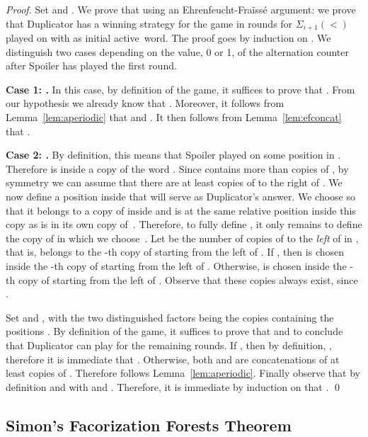 \documentclass[envcountsame]{llncs}
\newcommand{\efgame}{Ehrenfeucht-Fra\"iss\'e\xspace}
\newcommand{\siw}[1]{\ensuremath{\Sigma_{#1}(<)}\xspace}
\begin{document}
\begin{proof}
  Set  and . We prove
  that  using an \efgame argument: we prove that Duplicator
  has a winning strategy for the game in  rounds for \siw{i+1} played on  with 
  as initial active~word. The proof goes by induction on . We
  distinguish two cases depending on the value, 0 or 1, of the alternation counter 
  after Spoiler has played the first round.

  \medskip
  \noindent
  {\bf Case 1: .} In this case, by definition of the game, it
  suffices to prove that . From our hypothesis we
  already know that . Moreover, it follows from
  Lemma~\ref{lem:aperiodic} that 
  and . It then follows from
  Lemma~\ref{lem:efconcat} that .

  \medskip
  \noindent
  {\bf Case 2: .} By definition, this means that Spoiler played on some
  position  in . Therefore  is inside a copy of the word . Since
   contains more than  copies of , by symmetry we can assume
  that there are at least  copies of  to the right of . We now
  define a position  inside  that will serve as Duplicator's
  answer. We choose  so that it belongs to a copy of  inside  and
  is at the same relative position inside this copy as  is in its own copy
  of~. Therefore, to fully define , it only remains to define the copy
  of  in which we choose~. Let  be the number of copies of  to
  the \emph{left} of  in , that is,  belongs to the
  -th copy of    starting from the left of . If , then  is chosen inside the -th copy of 
  starting from the left of . Otherwise,  is chosen inside the
  -th copy of  starting from the left of . Observe
  that these copies always exist, since .

  Set  and , with the two distinguished  factors 
  being the copies containing the positions . By definition of
  the game, it suffices to prove that  and  to conclude that Duplicator
  can play for the remaining  rounds. If , then by 
  definition, , therefore it is immediate that
  . Otherwise, both  and
   are concatenations of at least  copies of
  . Therefore  follows
  Lemma~\ref{lem:aperiodic}. Finally observe that by definition  and  with  and . Therefore, it is immediate
  by induction on  that . \qed
\end{proof}



\subsection{Simon's Facorization Forests Theorem}
\end{document}
